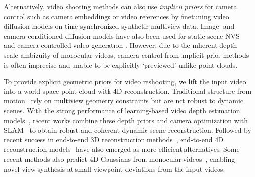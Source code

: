 Alternatively, video shooting methods can also use \emph{implicit priors} for camera control such as camera embeddings \cite{bai2025recammaster, vanhoorick2024gcd} or video references \cite{luo2025camclonemaster} by finetuning video diffusion models on time-synchronized synthetic multiview data. Image- and camera-conditioned diffusion models have also been used for static scene NVS~\cite{zhou2025seva, kant2024spad, liu2023zero123, shi2023mvdream,voleti2024sv3d} and camera-controlled video generation \cite{he2025cameractrlii,bahmani2024vd3d,xie2024sv4d}. However, due to the inherent depth scale ambiguity of monocular videos, camera control from implicit-prior methods is often imprecise and unable to be explicitly `previewed' unlike point clouds.

To provide explicit geometric priors for video reshooting, we lift the input video into a world-space point cloud with 4D reconstruction. Traditional structure from motion~\cite{schonberger2016colmap,wang2024vggsfm, pan2024glomap} rely on multiview geometry constraints but are not robust to dynamic scenes. With the strong performance of learning-based video depth estimation models~\cite{chen2025videodepthanything, hu2025depthcraft, xu2025geocraft, chou2025flashdepth,wang2025moge, piccinelli2025unidepthv2}, recent works \cite{li2025megasam, yao2025uni4d, huang2025vipe} combine these depth priors and camera optimization with SLAM~\cite{teed2021droid} to obtain robust and coherent dynamic scene reconstruction. Followed by recent success in end-to-end 3D reconstruction methods~\cite{wang2024dust3r, wang2025vggt, keetha2025mapanything}, end-to-end 4D reconstruction models~\cite{wang2025pi3, lan2025stream3r, sun2024monst3r, zhuo2025stream4dvgt, jiang2025geo4d} have also emerged as more efficient alternatives. Some recent methods also predict 4D Gaussians from monocular videos~\cite{lei2025mosca, wang2025shapeofmotion, wang2025gflow}, enabling novel view synthesis at small viewpoint deviations from the input videos.
